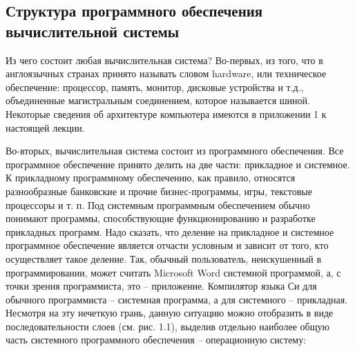 \subsection{Структура программного обеспечения вычислительной системы}%

Из чего состоит любая вычислительная система? Во-первых, из того, что в англоязычных странах принято называть словом hardware, или техническое обеспечение: процессор, память, монитор, дисковые устройства и т.д., объединенные магистральным соединением, которое называется шиной. Некоторые сведения об архитектуре компьютера имеются в приложении 1 к настоящей лекции.


Во-вторых, вычислительная система состоит из программного обеспечения. Все программное обеспечение принято делить на две части: прикладное и системное. К прикладному программному обеспечению, как правило, относятся разнообразные банковские и прочие бизнес-программы, игры, текстовые процессоры и т. п. Под системным программным обеспечением обычно понимают программы, способствующие функционированию и разработке прикладных программ. Надо сказать, что деление на прикладное и системное программное обеспечение является отчасти условным и зависит от того, кто осуществляет такое деление. Так, обычный пользователь, неискушенный в программировании, может считать Microsoft Word системной программой, а, с точки зрения программиста, это – приложение. Компилятор языка Си для обычного программиста – системная программа, а для системного – прикладная. Несмотря на эту нечеткую грань, данную ситуацию можно отобразить в виде последовательности слоев (см. рис. 1.1), выделив отдельно наиболее общую часть системного программного обеспечения – операционную систему:

